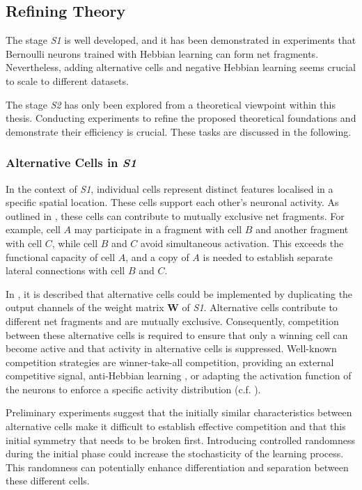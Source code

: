 \subsection{Refining Theory}
The stage \emph{S1} is well developed, and it has been demonstrated in experiments that Bernoulli neurons trained with Hebbian learning can form net fragments. Nevertheless, adding alternative cells and negative Hebbian learning seems crucial to scale to different datasets.

The stage \emph{S2} has only been explored from a theoretical viewpoint within this thesis. Conducting experiments to refine the proposed theoretical foundations and demonstrate their efficiency is crucial.
These tasks are discussed in the following.


\subsubsection{Alternative Cells in \emph{S1}}
In the context of \emph{S1}, individual cells represent distinct features localised in a specific spatial location. These cells support each other's neuronal activity. As outlined in , these cells can contribute to mutually exclusive net fragments. For example, cell $A$ may participate in a fragment with cell $B$ and another fragment with cell $C$, while cell $B$ and $C$ avoid simultaneous activation. This exceeds the functional capacity of cell $A$, and a copy of $A$ is needed to establish separate lateral connections with cell $B$ and $C$.

In , it is described that alternative cells could be implemented by duplicating the output channels of the weight matrix $\boldsymbol{W}$ of \emph{S1}.
Alternative cells contribute to different net fragments and are mutually exclusive.
Consequently, competition between these alternative cells is required to ensure that only a winning cell can become active and that activity in alternative cells is suppressed.
Well-known competition strategies are winner-take-all competition, providing an external competitive signal, anti-Hebbian learning , or adapting the activation function of the neurons to enforce a specific activity distribution  (c.f. ).

Preliminary experiments suggest that the initially similar characteristics between alternative cells make it difficult to establish effective competition and that this initial symmetry that needs to be broken first.
Introducing controlled randomness during the initial phase could increase the stochasticity of the learning process. This randomness can potentially enhance differentiation and separation between these different cells.

